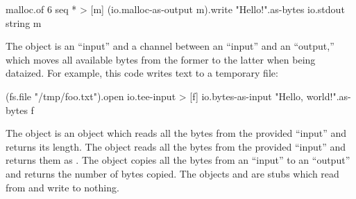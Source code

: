 \begin{ffcode}
malloc.of
  6
  seq * > [m]
    (io.malloc-as-output m).write
      "Hello!".as-bytes
    io.stdout
      string m
\end{ffcode}

The object  is an ``input'' and a channel between an ``input''
  and an ``output,'' which moves all available bytes from the former to the
  latter when being dataized.
%
For example, this code writes text to a temporary file:

\begin{ffcode}
(fs.file "/tmp/foo.txt").open
  io.tee-input > [f]
    io.bytes-as-input
      "Hello, world!".as-bytes
    f
\end{ffcode}

The object  is an object which reads all the bytes
  from the provided ``input'' and returns its length.
%
The object  reads all the bytes from the provided ``input''
  and returns them as .
%
The object  copies all the bytes from an ``input'' to an ``output''
  and returns the number of bytes copied.
%
The objects  and  are stubs which read from and write to nothing.
